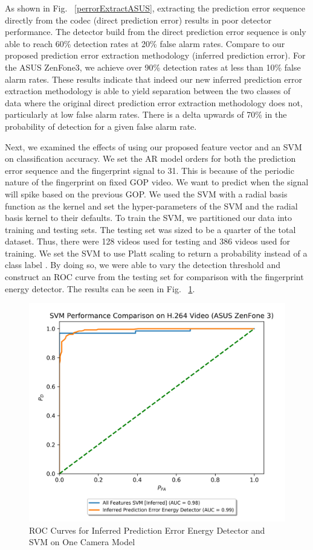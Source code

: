 As shown in Fig. ~\ref{perrorExtractASUS}, extracting the prediction error sequence directly from the codec (direct prediction error) results in poor detector performance. The detector build from the direct prediction error sequence is only able to reach 60\% detection rates at 20\% false alarm rates. Compare to our proposed prediction error extraction methodology (inferred prediction error). For the ASUS ZenFone3, we achieve over 90\% detection rates at less than 10\% false alarm rates. These results indicate that indeed our new inferred prediction error extraction methodology is able to yield separation between the two classes of data where the original direct prediction error extraction methodology does not, particularly at low false alarm rates. There is a delta upwards of 70\% in the probability of detection for a given false alarm rate.

Next, we examined the effects of using our proposed feature vector and an SVM on classification accuracy. We set the AR model orders for both the prediction error sequence and the fingerprint signal to 31. This is because of the periodic nature of the fingerprint on fixed GOP video. We want to predict when the signal will spike based on the previous GOP. We used the SVM with a radial basis function as the kernel and set the hyper-parameters of the SVM and the radial basis kernel to their defaults. To train the SVM, we partitioned our data into training and testing sets. The testing set was sized to be a quarter of the total dataset. Thus, there were 128 videos used for testing and 386 videos used for training. We set the SVM to use Platt scaling to return a probability instead of a class label \cite{plattscaling}. By doing so, we were able to vary the detection threshold and construct an ROC curve from the testing set for comparison with the fingerprint energy detector. The results can be seen in Fig. ~\ref{svmrocASUS}.

\begin{figure}[htbp]
\centerline{\includegraphics[width=0.7\linewidth]{ExperimentalResults/svm_perror_compare_roc.png}}
\caption{ROC Curves for Inferred Prediction Error Energy Detector and SVM on One Camera Model}
\label{svmrocASUS}
\end{figure}

